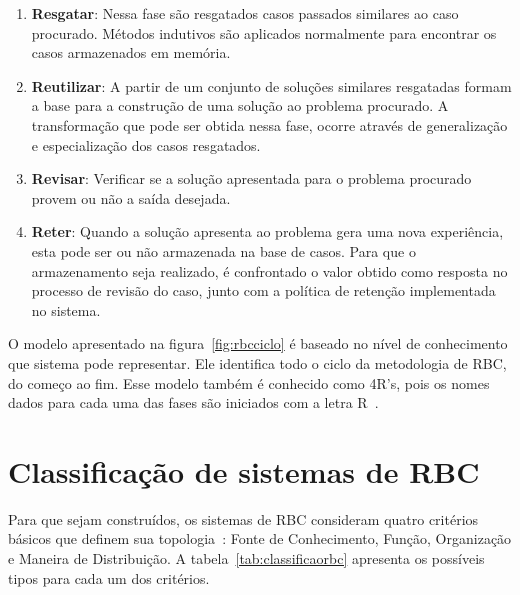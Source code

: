 \begin{enumerate}
	\item \textbf{Resgatar}: Nessa fase são resgatados casos passados similares ao caso procurado. Métodos indutivos são aplicados normalmente para encontrar os casos armazenados em memória.
	\item \textbf{Reutilizar}: A partir de um conjunto de soluções similares resgatadas formam a base para a construção de uma solução ao problema procurado. A transformação que pode ser obtida nessa fase, ocorre através de generalização e especialização dos casos resgatados.
	\item \textbf{Revisar}: Verificar se a solução apresentada para o problema procurado provem ou não a saída desejada.
	\item \textbf{Reter}: Quando a solução apresenta ao problema gera uma nova experiência, esta pode ser ou não armazenada na base de casos. Para que o armazenamento seja realizado, é confrontado o valor obtido como resposta no processo de revisão do caso, junto com a política de retenção implementada no sistema.
\end{enumerate}

O modelo apresentado na figura~\ref{fig:rbcciclo} é baseado no nível de conhecimento que sistema pode representar. Ele identifica todo o ciclo da metodologia de RBC, do começo ao fim. Esse modelo também é conhecido como 4R’s, pois os nomes dados para cada uma das fases são iniciados com a letra R~\cite{Lopez:2013}.

\section{Classificação de sistemas de RBC}
\label{sec:classificacaorbc}

Para que sejam construídos, os sistemas de RBC consideram quatro critérios básicos que definem sua topologia~\cite{Lopez:2013}: Fonte de Conhecimento, Função, Organização e Maneira de Distribuição. A tabela~\ref{tab:classificaorbc} apresenta os possíveis tipos para cada um dos critérios.

